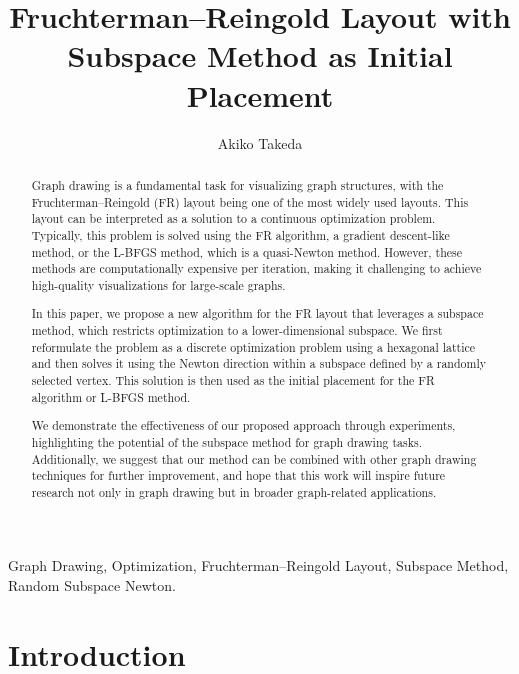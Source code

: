 \documentclass[dvipdfmx,lettersize,journal]{IEEEtran}
\begin{document}

\title{Fruchterman--Reingold Layout with\\Subspace Method as Initial Placement}
\author{
  Akiko Takeda
}
\maketitle

\begin{abstract}
  Graph drawing is a fundamental task for visualizing graph structures, with the Fruchterman--Reingold (FR) layout being one of the most widely used layouts. This layout can be interpreted as a solution to a continuous optimization problem. Typically, this problem is solved using the FR algorithm, a gradient descent-like method, or the L-BFGS method, which is a quasi-Newton method. However, these methods are computationally expensive per iteration, making it challenging to achieve high-quality visualizations for large-scale graphs.

  In this paper, we propose a new algorithm for the FR layout that leverages a subspace method, which restricts optimization to a lower-dimensional subspace. We first reformulate the problem as a discrete optimization problem using a hexagonal lattice and then solves it using the Newton direction within a subspace defined by a randomly selected vertex. This solution is then used as the initial placement for the FR algorithm or L-BFGS method.

  We demonstrate the effectiveness of our proposed approach through experiments, highlighting the potential of the subspace method for graph drawing tasks.
  Additionally, we suggest that our method can be combined with other graph drawing techniques for further improvement, and hope that this work will inspire future research not only in graph drawing but in broader graph-related applications.
\end{abstract}

\begin{IEEEkeywords}
  Graph Drawing, Optimization, Fruchterman--Reingold Layout, Subspace Method, Random Subspace Newton.
\end{IEEEkeywords}

\section{Introduction}\label{sec:introduction}
\end{document}
